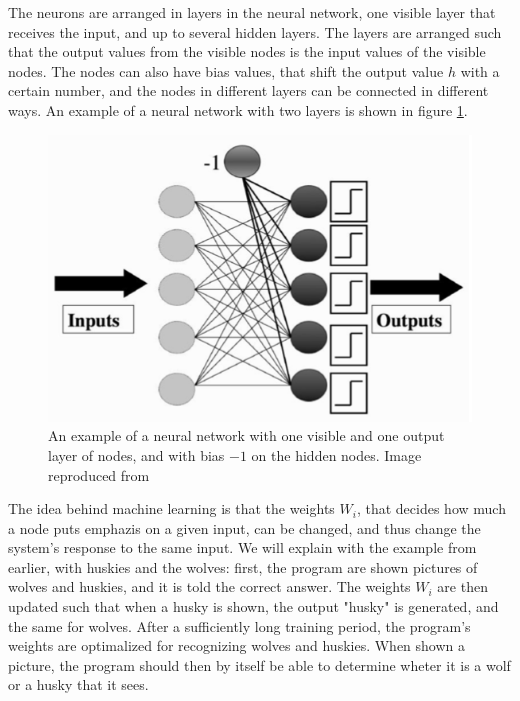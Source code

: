 \documentclass[norsk,a4paper,12pt]{article}
\begin{document}
The neurons are arranged in layers in the neural network, one visible layer that receives the input, and up to several hidden layers. The layers are arranged such that the output values from the visible nodes is the input values of the visible nodes. The nodes can also have bias values, that shift the output value $h$ with a certain number, and the nodes in different layers can be connected in different ways.  An example of a neural network with two layers is shown in figure \ref{fig:neural_network}.

 \begin{figure} [H]
	\centering
	\includegraphics[scale=0.5]{plots/neural_network.png}
	\caption{An example of a neural network with one visible and one output layer of nodes, and with bias $-1$ on the hidden nodes. Image reproduced from \cite{Marsland} }
	\label{fig:neural_network}
\end{figure}

The idea behind machine learning is that the weights $W_i$, that decides how much a node puts emphazis on a given input, can be changed, and thus change the system's response to the same input. We will explain with the example from earlier, with huskies and the wolves: first, the program are shown pictures of wolves and huskies, and it is told the correct answer. The weights $W_i$ are then updated such that when a husky is shown, the output "husky" is generated, and the same for wolves. After a sufficiently long training period, the program's weights are optimalized for recognizing wolves and huskies. When shown a picture, the program should then by itself be able to determine wheter it is a wolf or a husky that it sees. 
\end{document}
